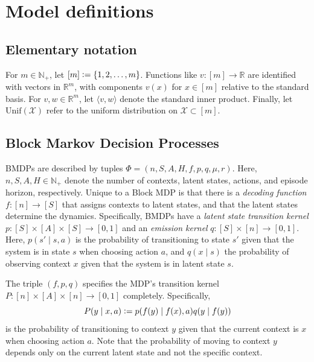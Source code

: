 \documentclass[11pt]{article}
\newcommand{\eqdef}{\vcentcolon=}
\newcommand{\mcX}{\mathcal{X}}
\newcommand{\mbbN}{\mathbb{N}}
\newcommand{\mbbR}{\mathbb{R}}
\theoremstyle{definition}
\theoremstyle{definition}
\begin{document}
\section{Model definitions}
\label{sec:models}

\subsection*{Elementary notation}

For $m\in \mathbb{N}_+$, let $[m] \eqdef \{1,2,\ldots, m\}$.
Functions like $v:[m]\rightarrow\mbbR$ are identified with vectors in $\mbbR^m$, with components $v(x)$ for $x\in[m]$ relative to the standard basis.
For $v,w\in\mbbR^m$, let $\langle v,w\rangle$ denote the standard inner product.
Finally, let $\mathrm{Unif}(\mcX)$ refer to the uniform distribution on $\mcX\subset[m]$.

\subsection{Block Markov Decision Processes}
\label{sec:Block-MDPs}

\glspl{BMDP} are described by tuples $\Phi = (n, S, A, H, \allowbreak f, \allowbreak p, \allowbreak q, \mu, r)$.
Here, $n, S, A, H \in \mbbN_+$ denote the number of contexts, latent states, actions, and episode horizon, respectively.
Unique to a Block \gls{MDP} is that there is a \emph{decoding function} $f:[n]\rightarrow [S]$ that assigns contexts to latent states, and that the latent states determine the dynamics.
Specifically, \glspl{BMDP} have a \textit{latent state transition kernel} $p:[S]\times[A]\times[S]\rightarrow [0,1]$ and an \textit{emission kernel} $q:[S]\times[n]\rightarrow[0,1]$.
Here, $p(s'\mid s,a)$ is the probability of transitioning to state $s'$ given that the system is in state $s$ when choosing action $a$, and $q(x\mid s)$ the probability of observing context $x$ given that the system is in latent state $s$.

The triple $(f,p,q)$ specifies the \gls{MDP}'s transition kernel $P:[n]\times[A]\times[n]\rightarrow [0,1]$ completely.
Specifically,
\begin{equation}
	P(y \mid x, a)
	\eqdef
	p( f(y) \mid f(x), a )
	q( y \mid f(y) )
	\label{def:BMDP-transition-kernel}
\end{equation}
is the probability of transitioning to context $y$ given that the current context is $x$ when choosing action $a$.
Note that the probability of moving to context $y$ depends only on the current latent state and not the specific context.
\end{document}
